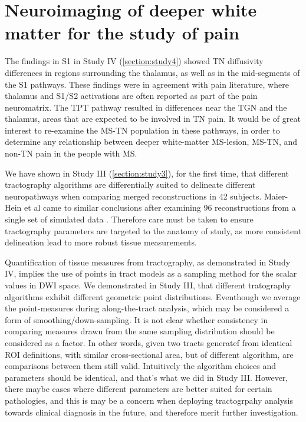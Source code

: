 \section{Neuroimaging of deeper white matter for the study of pain}

The findings in S1 in Study IV (\ref{section:study4}) showed TN diffusivity differences in regions surrounding the thalamus, as well as in the mid-segments of the S1 pathways. These findings were in agreement with pain literature, where thalamus and S1/S2 activations are often reported as part of the pain neuromatrix. The TPT pathway resulted in differences near the TGN and the thalamus, areas that are expected to be involved in TN pain. It would be of great interest to re-examine the MS-TN population in these pathways, in order to determine any relationship between deeper white-matter MS-lesion, MS-TN, and non-TN pain in the people with MS.

We have shown in Study III (\ref{section:study3}), for the first time, that different tractography algorithms are differentially suited to delineate different neuropathways when comparing merged reconstructions in 42 subjects. Maier-Hein et al came to similar conclusions after examining 96 reconstructions from a single set of simulated data \cite{Maier-Hein2017}.
Therefore care must be taken to ensure tractography parameters are targeted to the anatomy of study, as more consistent delineation lead to more robust tissue measurements.

Quantification of tissue measures from tractography, as demonstrated in Study IV, implies the use of points in tract models as a sampling method for the scalar values in DWI space. We demonstrated in Study III, that different tratography algorithms exhibit different geometric point distributions. Eventhough we average the point-measures during along-the-tract analysis, which may be considered a form of smoothing/down-sampling. It is not clear whether consistency in comparing measures drawn from the same sampling distribution should be considered as a factor. In other words, given two tracts generatef from identical ROI definitions, with similar cross-sectional area, but of different algorithm, are comparisons between them still valid. Intuitively the algorithm choices and parameters should be identical, and that's what we did in Study III. However, there maybe cases where different parameters are better suited for certain pathologies, and this is may be a concern when deploying tractogrpahy analysis towards clinical diagnosis in the future, and therefore merit further investigation.



